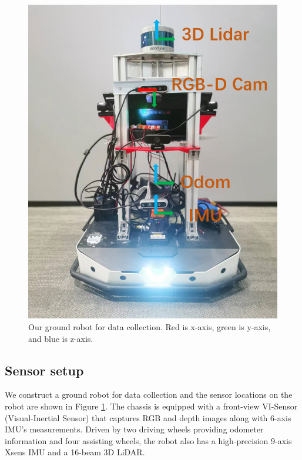 \documentclass[conference]{IEEEtran}
\begin{document}
		
	\begin{figure}
		\centering
		\includegraphics[scale=0.42]{fig/robot2.jpg}
		\caption{Our ground robot for data collection. Red is x-axis, green is y-axis, and blue is z-axis.   }
		\label{car}
	\end{figure}

	
	
	\subsection{Sensor setup}
We construct a ground robot for data collection and the sensor locations on the robot are shown in Figure \ref{car}. The chassis is equipped with a front-view VI-Sensor (Visual-Inertial Sensor) that captures RGB and depth images along with 6-axis IMU's measurements. Driven by two driving wheels providing odometer information and four assisting wheels, the robot also has a high-precision 9-axis Xsens IMU and a 16-beam 3D LiDAR.
\end{document}
